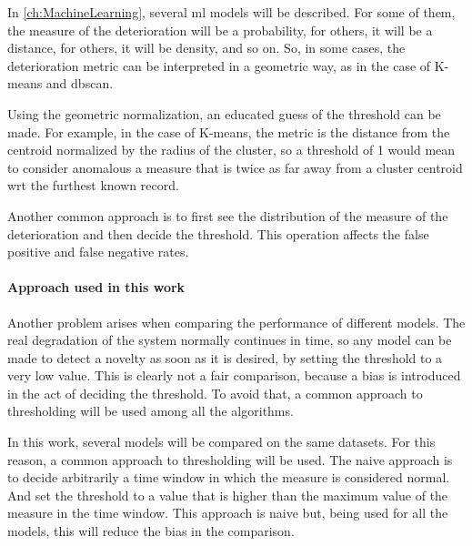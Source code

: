 In \autoref{ch:MachineLearning}, several \gls{ml} models will be described. For some of them, the measure of the deterioration will be a probability, for others, it will be a distance, for others, it will be density, and so on. So, in some cases, the deterioration metric can be interpreted in a geometric way, as in the case of K-means and \gls{dbscan}.

Using the geometric normalization, an educated guess of the threshold can be made. For example, in the case of K-means, the metric is the distance from the centroid normalized by the radius of the cluster, so a threshold of 1 would mean to consider anomalous a measure that is twice as far away from a cluster centroid \gls{wrt} the furthest known record.

Another common approach is to first see the distribution of the measure of the deterioration and then decide the threshold. This operation affects the false positive and false negative rates.

\paragraph{Approach used in this work}

Another problem arises when comparing the performance of different models. The real degradation of the system normally continues in time, so any model can be made to detect a novelty as soon as it is desired, by setting the threshold to a very low value. This is clearly not a fair comparison, because a bias is introduced in the act of deciding the threshold. To avoid that, a common approach to thresholding will be used among all the algorithms.

In this work, several models will be compared on the same datasets. For this reason, a common approach to thresholding will be used. The naive approach is to decide arbitrarily a time window in which the measure is considered normal. And set the threshold to a value that is higher than the maximum value of the measure in the time window. This approach is naive but, being used for all the models, this will reduce the bias in the comparison.